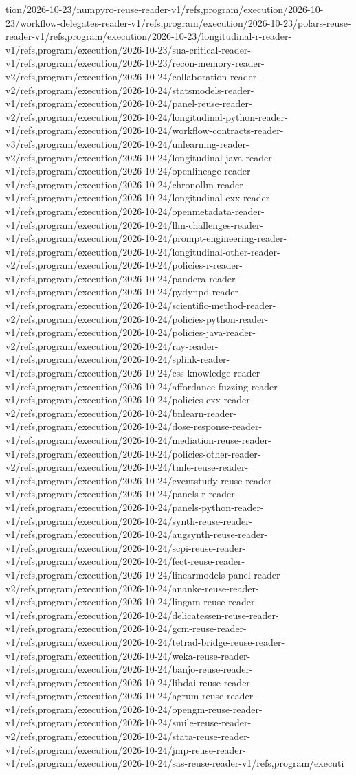 \documentclass[11pt,a4paper,openany]{book}
\begin{document}
tion/2026-10-23/numpyro-reuse-reader-v1/refs,program/execution/2026-10-23/workflow-delegates-reader-v1/refs,program/execution/2026-10-23/polars-reuse-reader-v1/refs,program/execution/2026-10-23/longitudinal-r-reader-v1/refs,program/execution/2026-10-23/sua-critical-reader-v1/refs,program/execution/2026-10-23/recon-memory-reader-v2/refs,program/execution/2026-10-24/collaboration-reader-v2/refs,program/execution/2026-10-24/statsmodels-reader-v1/refs,program/execution/2026-10-24/panel-reuse-reader-v2/refs,program/execution/2026-10-24/longitudinal-python-reader-v1/refs,program/execution/2026-10-24/workflow-contracts-reader-v3/refs,program/execution/2026-10-24/unlearning-reader-v2/refs,program/execution/2026-10-24/longitudinal-java-reader-v1/refs,program/execution/2026-10-24/openlineage-reader-v1/refs,program/execution/2026-10-24/chronollm-reader-v1/refs,program/execution/2026-10-24/longitudinal-cxx-reader-v1/refs,program/execution/2026-10-24/openmetadata-reader-v1/refs,program/execution/2026-10-24/llm-challenges-reader-v1/refs,program/execution/2026-10-24/prompt-engineering-reader-v1/refs,program/execution/2026-10-24/longitudinal-other-reader-v2/refs,program/execution/2026-10-24/policies-r-reader-v1/refs,program/execution/2026-10-24/pandera-reader-v1/refs,program/execution/2026-10-24/pydynpd-reader-v1/refs,program/execution/2026-10-24/scientific-method-reader-v2/refs,program/execution/2026-10-24/policies-python-reader-v1/refs,program/execution/2026-10-24/policies-java-reader-v2/refs,program/execution/2026-10-24/ray-reader-v1/refs,program/execution/2026-10-24/splink-reader-v1/refs,program/execution/2026-10-24/css-knowledge-reader-v1/refs,program/execution/2026-10-24/affordance-fuzzing-reader-v1/refs,program/execution/2026-10-24/policies-cxx-reader-v2/refs,program/execution/2026-10-24/bnlearn-reader-v1/refs,program/execution/2026-10-24/dose-response-reader-v1/refs,program/execution/2026-10-24/mediation-reuse-reader-v1/refs,program/execution/2026-10-24/policies-other-reader-v2/refs,program/execution/2026-10-24/tmle-reuse-reader-v1/refs,program/execution/2026-10-24/eventstudy-reuse-reader-v1/refs,program/execution/2026-10-24/panels-r-reader-v1/refs,program/execution/2026-10-24/panels-python-reader-v1/refs,program/execution/2026-10-24/synth-reuse-reader-v1/refs,program/execution/2026-10-24/augsynth-reuse-reader-v1/refs,program/execution/2026-10-24/scpi-reuse-reader-v1/refs,program/execution/2026-10-24/fect-reuse-reader-v1/refs,program/execution/2026-10-24/linearmodels-panel-reader-v2/refs,program/execution/2026-10-24/ananke-reuse-reader-v1/refs,program/execution/2026-10-24/lingam-reuse-reader-v1/refs,program/execution/2026-10-24/delicatessen-reuse-reader-v1/refs,program/execution/2026-10-24/gcm-reuse-reader-v1/refs,program/execution/2026-10-24/tetrad-bridge-reuse-reader-v1/refs,program/execution/2026-10-24/weka-reuse-reader-v1/refs,program/execution/2026-10-24/banjo-reuse-reader-v1/refs,program/execution/2026-10-24/libdai-reuse-reader-v1/refs,program/execution/2026-10-24/agrum-reuse-reader-v1/refs,program/execution/2026-10-24/opengm-reuse-reader-v1/refs,program/execution/2026-10-24/smile-reuse-reader-v2/refs,program/execution/2026-10-24/stata-reuse-reader-v1/refs,program/execution/2026-10-24/jmp-reuse-reader-v1/refs,program/execution/2026-10-24/sas-reuse-reader-v1/refs,program/executi
\end{document}
